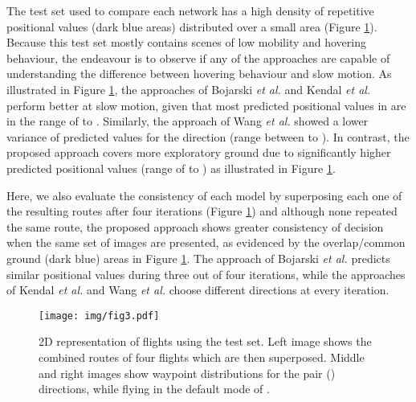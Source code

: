 \documentclass[letterpaper, 10 pt, journal, twoside]{IEEEtran}
\newcommand{\etal}{\emph{et al.}}
\begin{document}
The test set used to compare each network has a high density of repetitive positional values (dark blue areas) distributed over a small area (Figure \ref{fig:gt_dist}). Because this test set mostly contains scenes of low mobility and hovering behaviour, the endeavour is to observe if any of the approaches are capable of understanding the difference between hovering behaviour and slow motion. As illustrated in Figure \ref{fig:gt_dist}, the approaches of Bojarski \etal \cite{bojarski2016end} and Kendal \etal \cite{kendall2015posenet} perform better at slow motion, given that most predicted positional values in  are in the range of  to . Similarly, the approach of Wang \etal  \cite{wang2017deepvo} showed a lower variance of predicted values for the  direction (range between  to ). In contrast, the proposed approach covers more exploratory ground due to significantly higher predicted positional values (range of  to ) as illustrated in Figure \ref{fig:gt_dist}.

 Here, we also evaluate the consistency of each model by superposing each one of the resulting routes after four iterations (Figure \ref{fig:gt_dist}) and although none repeated the same route, the proposed approach shows greater consistency of decision when the same set of images are presented, as evidenced by the overlap/common ground (dark blue) areas in Figure \ref{fig:gt_dist}. The approach of Bojarski \etal \cite{bojarski2016end} predicts similar positional values during three out of four iterations, while the approaches of Kendal \etal \cite{kendall2015posenet} and Wang \etal  \cite{wang2017deepvo} choose different directions at every iteration.


\begin{figure}
    \centering
\texttt{[image: img/fig3.pdf]}
    \vspace{-0.5cm}
    \caption{2D representation of flights using the test set. Left image shows the combined routes of four flights which are then superposed. Middle and right images show waypoint distributions for the pair () directions, while flying in the default mode of .}
    \label{fig:gt_dist}\vspace{-0.3cm}
\end{figure}
\end{document}
